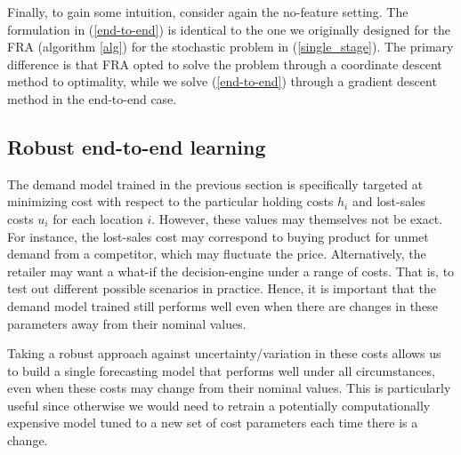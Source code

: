 \documentclass[poms,final,blindrev]{poms1_V1} %
\begin{document}
Finally, to gain some intuition, consider again the no-feature setting. The formulation in (\ref{end-to-end}) is identical to the one we originally designed for the FRA (algorithm \ref{alg}) for the stochastic problem in (\ref{single_stage}). The primary difference is that FRA opted to solve the problem through a coordinate descent method to optimality, while we solve (\ref{end-to-end}) through a gradient descent method in the end-to-end case.

\subsection{Robust end-to-end learning}
\label{sec:robust}

The demand model trained in the previous section is specifically targeted at minimizing cost with respect to the particular holding costs $h_i$ and lost-sales costs $u_i$ {for each location $i$}. However, these values may themselves not be exact. For instance, the lost-sales cost may correspond to buying product for unmet demand from a competitor, which may fluctuate the price. {Alternatively, the retailer may want a what-if the decision-engine under a range of costs.} That is, to test out different possible scenarios in practice. Hence, it is important that the demand model trained still performs well even when there are changes in these parameters away from their nominal values. 

Taking a robust approach against uncertainty/variation in these costs allows us to build a single forecasting model that performs well under all circumstances, even when these costs may change from their nominal values. This is particularly useful since otherwise we would need to retrain a potentially computationally expensive model tuned to a new set of cost parameters each time there is a change. 
\end{document}
